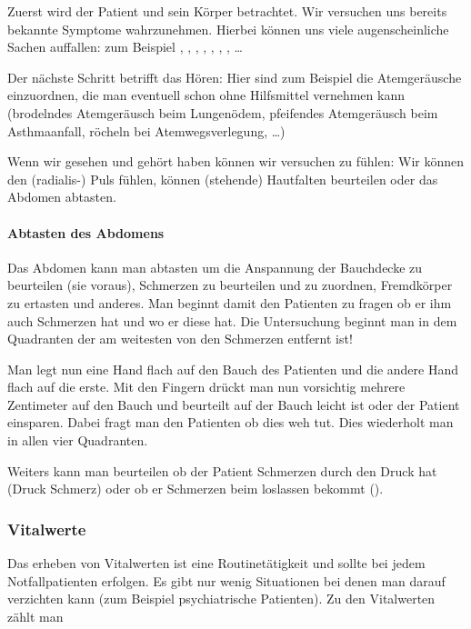 Zuerst wird der Patient und sein
Körper betrachtet. Wir versuchen uns bereits bekannte Symptome wahrzunehmen. Hierbei können uns viele
augenscheinliche Sachen auffallen: zum Beispiel
, , ,
, , , ,
\ldots

Der nächste Schritt betrifft das Hören: Hier sind zum
Beispiel die Atemgeräusche einzuordnen, die man eventuell schon ohne
Hilfsmittel vernehmen kann (brodelndes Atemgeräusch beim
Lungenödem, pfeifendes Atemgeräusch beim Asthmaanfall,
röcheln bei Atemwegsverlegung, \ldots)

Wenn wir gesehen und gehört haben können wir versuchen zu
fühlen: Wir können den (radialis-) Puls fühlen, können
(stehende) Hautfalten beurteilen oder das Abdomen abtasten.

\paragraph{Abtasten des
Abdomens}\label{topic:untersuchung-abdomen-abtasten}

Das Abdomen kann man abtasten um die Anspannung der
Bauchdecke zu beurteilen (sie voraus), Schmerzen zu
beurteilen und zu zuordnen, Fremdkörper zu ertasten und
anderes. Man beginnt damit den Patienten zu fragen ob er ihm
auch Schmerzen hat und wo er diese hat. Die Untersuchung
beginnt man in dem Quadranten der am weitesten von den
Schmerzen entfernt ist!

Man legt nun eine Hand flach auf den Bauch des Patienten und
die andere Hand flach auf die erste. Mit den Fingern drückt
man nun vorsichtig mehrere Zentimeter auf den Bauch und
beurteilt auf der Bauch leicht ist oder der Patient
einsparen. Dabei fragt man den Patienten ob dies weh tut.
Dies wiederholt man in allen vier Quadranten.

Weiters kann man beurteilen ob der Patient Schmerzen durch
den Druck hat (Druck Schmerz) oder ob er Schmerzen beim
loslassen bekommt
().

\subsubsection{Vitalwerte}
Das erheben von Vitalwerten ist eine Routinetätigkeit und
sollte bei jedem Notfallpatienten erfolgen. Es gibt nur wenig
Situationen bei denen man darauf verzichten kann (zum
Beispiel psychiatrische Patienten). Zu den Vitalwerten zählt man

